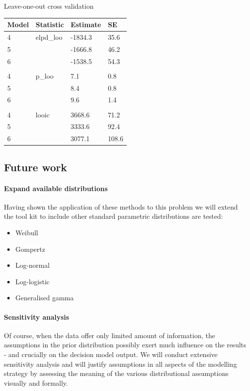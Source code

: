 \documentclass[
]{article}
\providecommand{\tightlist}{%
  \setlength{\itemsep}{0pt}\setlength{\parskip}{0pt}}
\begin{document}
Leave-one-out cross validation

\begin{longtable}[]{@{}llll@{}}
\toprule
Model & Statistic & Estimate & SE\tabularnewline
\midrule
\endhead
4 & elpd\_loo & -1834.3 & 35.6\tabularnewline
5 & & -1666.8 & 46.2\tabularnewline
6 & & -1538.5 & 54.3\tabularnewline
& & &\tabularnewline
4 & p\_loo & 7.1 & 0.8\tabularnewline
5 & & 8.4 & 0.8\tabularnewline
6 & & 9.6 & 1.4\tabularnewline
& & &\tabularnewline
4 & looic & 3668.6 & 71.2\tabularnewline
5 & & 3333.6 & 92.4\tabularnewline
6 & & 3077.1 & 108.6\tabularnewline
\bottomrule
\end{longtable}

\hypertarget{future-work}{%
\subsection{Future work}\label{future-work}}

\hypertarget{expand-available-distributions}{%
\paragraph{Expand available
distributions}\label{expand-available-distributions}}

Having shown the application of these methods to this problem we will
extend the tool kit to include other standard parametric distributions
are tested:

\begin{itemize}
\tightlist
\item
  Weibull
\item
  Gompertz
\item
  Log-normal
\item
  Log-logistic
\item
  Generalised gamma
\end{itemize}

\hypertarget{sensitivity-analysis}{%
\paragraph{Sensitivity analysis}\label{sensitivity-analysis}}

Of course, when the data offer only limited amount of information, the
assumptions in the prior distribution possibly exert much influence on
the results - and crucially on the decision model output. We will
conduct extensive sensitivity analysis and will justify assumptions in
all aspects of the modelling strategy by assessing the meaning of the
various distributional assumptions visually and formally.
\end{document}

